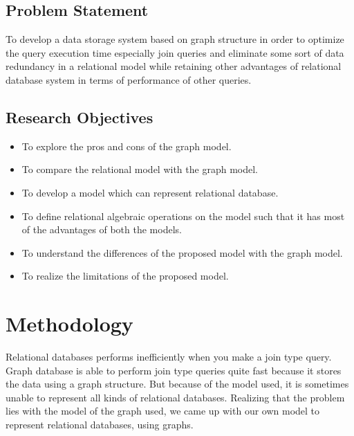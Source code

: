 \documentclass[12pt, oneside]{book}
\begin{document}
\section{Problem Statement}
To develop a data storage system based on graph structure in order to optimize the query execution time especially join queries and eliminate some sort of data redundancy in a relational model while retaining other advantages of relational database system in terms of performance of other queries.  

\section{Research Objectives}
\begin{itemize}
 \item To explore the pros and cons of the graph model.
 \item To compare the relational model with the graph model.
 \item To develop a model which can represent relational database.
 \item To define relational algebraic operations on the model such that it has most of the advantages of both the models.
 \item To understand the differences of the proposed model with the graph model.
 \item To realize the limitations of the proposed model.
\end{itemize}

\chapter{Methodology}
Relational databases performs inefficiently when you make a join type query. Graph database is able to perform join type queries quite fast because it stores the data using a graph structure. But because of the model used, it is sometimes unable to represent all kinds of relational databases. Realizing that the problem lies with the model of the graph used, we came up with our own model to represent relational databases, using graphs.\\
\end{document}
